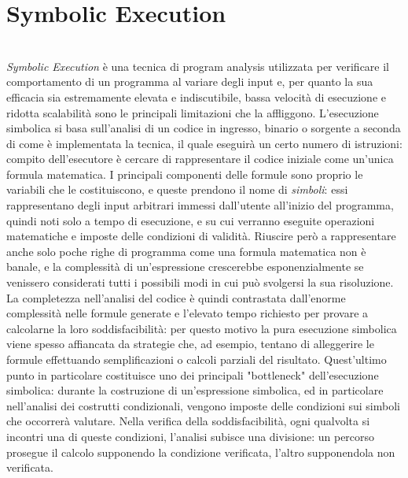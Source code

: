 \documentclass[Lau, oneside]{sapthesis}%
\begin{document}
\chapter{Symbolic Execution}
\ \\
\textit{Symbolic Execution} è una tecnica di program analysis utilizzata per verificare il comportamento di un programma al variare degli input e, per quanto la sua efficacia sia estremamente elevata e indiscutibile, bassa velocità di esecuzione e ridotta scalabilità sono le principali limitazioni che la affliggono.
\newline \newline
L'esecuzione simbolica si basa sull'analisi di un codice in ingresso, binario o sorgente a seconda di come è implementata la tecnica, il quale eseguirà un certo numero di istruzioni: compito dell'esecutore è cercare di rappresentare il codice iniziale come un'unica formula matematica.
\newline
I principali componenti delle formule sono proprio le variabili che le costituiscono, e queste prendono il nome di \textit{simboli}: essi rappresentano degli input arbitrari immessi dall'utente all'inizio del programma, quindi noti solo a tempo di esecuzione, e su cui verranno eseguite operazioni matematiche e imposte delle condizioni di validità.
\newline \newline
Riuscire però a rappresentare anche solo poche righe di programma come una formula matematica non è banale, e la complessità di un'espressione crescerebbe esponenzialmente se venissero considerati tutti i possibili modi in cui può svolgersi la sua risoluzione.
\newline
La completezza nell'analisi del codice è quindi contrastata dall'enorme complessità nelle formule generate e l'elevato tempo richiesto per provare a calcolarne la loro soddisfacibilità: per questo motivo la pura esecuzione simbolica viene spesso affiancata da strategie che, ad esempio, tentano di alleggerire le formule effettuando semplificazioni o calcoli parziali del risultato.
\newline \newline
Quest'ultimo punto in particolare costituisce uno dei principali "bottleneck" dell'esecuzione simbolica: durante la costruzione di un'espressione simbolica, ed in particolare nell'analisi dei costrutti condizionali, vengono imposte delle condizioni sui simboli che occorrerà valutare.
\newline
Nella verifica della soddisfacibilità, ogni qualvolta si incontri una di queste condizioni, l'analisi subisce una divisione: un percorso prosegue il calcolo supponendo la condizione verificata, l'altro supponendola non verificata.
\end{document}
